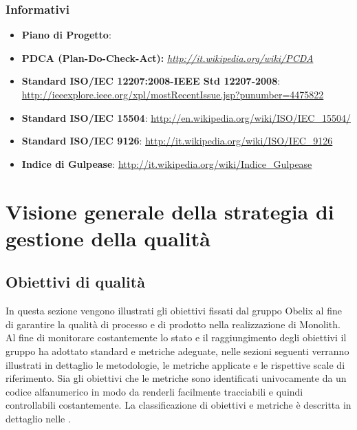 \subsubsection{Informativi}

\begin{itemize}
\item \textbf{Piano di Progetto}: \pianodiprogetto
\item \textbf{PDCA (Plan-Do-Check-Act): } \emph{\url{http://it.wikipedia.org/wiki/PCDA}}
\item \textbf{Standard ISO/IEC 12207:2008-IEEE Std 12207-2008}: \url{http://ieeexplore.ieee.org/xpl/mostRecentIssue.jsp?punumber=4475822}
\item \textbf{Standard ISO/IEC 15504}:  \url{http://en.wikipedia.org/wiki/ISO/IEC\_15504/}
\item \textbf{Standard ISO/IEC 9126}: \url{http://it.wikipedia.org/wiki/ISO/IEC\_9126}
\item \textbf{Indice di Gulpease}: \url{http://it.wikipedia.org/wiki/Indice\_Gulpease}
\end{itemize}



\section[Visione generale della qualità]{Visione generale della strategia di gestione della qualità}



\subsection{Obiettivi di qualità}

In questa sezione vengono illustrati gli obiettivi fissati dal gruppo Obelix al fine di garantire la qualità di processo e di prodotto nella realizzazione di Monolith.
Al fine di monitorare costantemente lo stato e il raggiungimento degli obiettivi il gruppo
ha adottato standard e metriche adeguate, nelle sezioni seguenti verranno illustrati in
dettaglio le metodologie, le metriche applicate e le rispettive scale di riferimento.
Sia gli obiettivi che le metriche sono identificati univocamente da un codice alfanumerico
in modo da renderli facilmente tracciabili e quindi controllabili costantemente. La classificazione di obiettivi e metriche è descritta in dettaglio nelle \normediprogetto.

